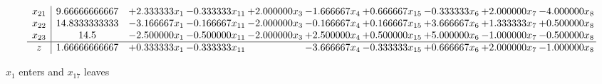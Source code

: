 \documentclass[10pt]{article}
\begin{document}
\[\begin{array}{c| c c@{\hskip 2pt} c@{\hskip 2pt} c@{\hskip 2pt} c@{\hskip 2pt} c@{\hskip 2pt} c@{\hskip 2pt} c@{\hskip 2pt} c@{\hskip 2pt} }
 x_{21}   &  9.66666666667 & + 2.333333 x_{1} & -0.333333 x_{11} & + 2.000000 x_{3} & -1.666667 x_{4} & + 0.666667 x_{15} & -0.333333 x_{6} & + 2.000000 x_{7} & -4.000000 x_{8}\\
 x_{22}   &  14.8333333333 & -3.166667 x_{1} & -0.166667 x_{11} & -2.000000 x_{3} & -0.166667 x_{4} & + 0.166667 x_{15} & + 3.666667 x_{6} & + 1.333333 x_{7} & + 0.500000 x_{8}\\
 x_{23}   &  14.5 & -2.500000 x_{1} & -0.500000 x_{11} & -2.000000 x_{3} & + 2.500000 x_{4} & + 0.500000 x_{15} & + 5.000000 x_{6} & -1.000000 x_{7} & -0.500000 x_{8}\\
\hline
z    &  1.66666666667 & + 0.333333 x_{1} & -0.333333 x_{11} &   & -3.666667 x_{4} & -0.333333 x_{15} & + 0.666667 x_{6} & + 2.000000 x_{7} & -1.000000 x_{8}\\
\end{array}\]


 $ x_{1} $ enters and $ x_{17} $ leaves 
\end{document}

